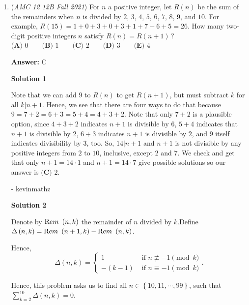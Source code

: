 \begin{enumerate}
 The coordinates of $C$ are $(24, 0)$, so 
 \[CF=\sqrt{(24+\frac{81}{16})^2+(\frac{45\sqrt7}{16})^2}=\sqrt{(\frac{465}{16})^2+(\frac{45\sqrt7}{16})^2}=\frac{\sqrt{465^2+(45\sqrt7)^2}}{16}=\frac{\sqrt{(15\cdot 31)^2+(15\cdot 3\sqrt7)^2}}{16}=\frac{15\sqrt{31^2+(3\sqrt7)^2}}{16}=\frac{15\sqrt{961+63}}{16}=\frac{15\sqrt{1024}}{16}=\frac{15}{16}\cdot 32=30.\]



	\item (\textit{AMC 12 12B Fall 2021}) For $n$ a positive integer, let $R(n)$ be the sum of the remainders when $n$ is divided by $2$, $3$, $4$, $5$, $6$, $7$, $8$, $9$, and $10$. For example, $R(15) = 1+0+3+0+3+1+7+6+5=26$. How many two-digit positive integers $n$ satisfy $R(n) = R(n+1)\,?$
$\textbf{(A) }0\qquad\textbf{(B) }1\qquad\textbf{(C) }2\qquad\textbf{(D) }3\qquad\textbf{(E) }4$

 \textbf{Answer: }C



\textbf{Solution 1}

Note that we can add $9$ to $R(n)$ to get $R(n+1)$, but must subtract $k$ for all $k|n+1$. Hence, we see that there are four ways to do that because $9=7+2=6+3=5+4=4+3+2$. Note that only $7+2$ is a plausible option, since $4+3+2$ indicates $n+1$ is divisible by $6$, $5+4$ indicates that $n+1$ is divisible by $2$, $6+3$ indicates $n+1$ is divisible by $2$, and $9$ itself indicates divisibility by $3$, too. So, $14|n+1$ and $n+1$ is not divisible by any positive integers from $2$ to $10$, inclusive, except $2$ and $7$. We check and get that only $n+1=14 \cdot 1$ and $n+1=14 \cdot 7$ give possible solutions so our answer is $\boxed{\textbf{(C) }2}$.

 - kevinmathz

 



\textbf{Solution 2}

Denote by ${\textrm Rem} \ \left( n, k \right)$ the remainder of $n$ divided by $k$.Define $\Delta \left( n, k \right) = {\textrm Rem} \ \left( n + 1, k \right) - {\textrm Rem} \ \left( n, k \right)$.

 Hence,
 \[ \Delta \left( n, k \right) = \left\{ \begin{array}{ll} 1 & \mbox{ if } n \not\equiv -1 \pmod{k} \\ - \left( k  -1 \right) & \mbox{ if } n \equiv -1 \pmod{k} \end{array} \right.. \]

 Hence, this problem asks us to find all $n \in \left\{ 10 , 11, \cdots , 99 \right\}$, such that $\sum_{k = 2}^{10} \Delta \left( n, k \right) = 0$.


\end{enumerate}
